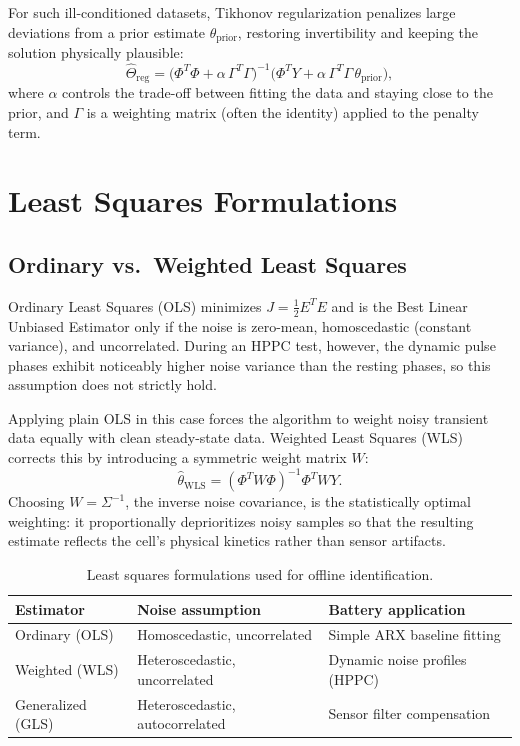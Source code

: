 For such ill-conditioned datasets, Tikhonov regularization penalizes large deviations from a prior estimate $\theta_{\mathrm{prior}}$, restoring invertibility and keeping the solution physically plausible:
\begin{equation}
\label{eq:tikhonov_solution}
\hat{\Theta}_{\mathrm{reg}} = \big(\Phi^T \Phi + \alpha\, \Gamma^T \Gamma\big)^{-1} \big(\Phi^T Y + \alpha\, \Gamma^T \Gamma\, \theta_{\mathrm{prior}}\big),
\end{equation}
where $\alpha$ controls the trade-off between fitting the data and staying close to the prior, and $\Gamma$ is a weighting matrix (often the identity) applied to the penalty term.

\section{Least Squares Formulations}
\label{sec:least_squares_formulations}

\subsection{Ordinary vs.\ Weighted Least Squares}

Ordinary Least Squares (OLS) minimizes $J = \tfrac{1}{2}E^TE$ and is the Best Linear Unbiased Estimator only if the noise is zero-mean, homoscedastic (constant variance), and uncorrelated. During an HPPC test, however, the dynamic pulse phases exhibit noticeably higher noise variance than the resting phases, so this assumption does not strictly hold.

Applying plain OLS in this case forces the algorithm to weight noisy transient data equally with clean steady-state data. Weighted Least Squares (WLS) corrects this by introducing a symmetric weight matrix $W$:
\begin{equation}
\label{eq:wls_estimator}
\hat{\theta}_{\mathrm{WLS}} = (\Phi^T W \Phi)^{-1} \Phi^T W Y.
\end{equation}
Choosing $W = \Sigma^{-1}$, the inverse noise covariance, is the statistically optimal weighting: it proportionally deprioritizes noisy samples so that the resulting estimate reflects the cell's physical kinetics rather than sensor artifacts.

\begin{table}[htbp]
\centering
\caption{Least squares formulations used for offline identification.}
\label{tab:ls_comparison}
\footnotesize
\begin{tabularx}{\textwidth}{
    >{\raggedright\arraybackslash}p{2.6cm}
    >{\raggedright\arraybackslash}X
    >{\raggedright\arraybackslash}X
}
\toprule
\textbf{Estimator} & \textbf{Noise assumption} & \textbf{Battery application} \\
\midrule
Ordinary (OLS) & Homoscedastic, uncorrelated & Simple ARX baseline fitting \\
Weighted (WLS) & Heteroscedastic, uncorrelated & Dynamic noise profiles (HPPC) \\
Generalized (GLS) & Heteroscedastic, autocorrelated & Sensor filter compensation \\
\bottomrule
\end{tabularx}
\end{table}

